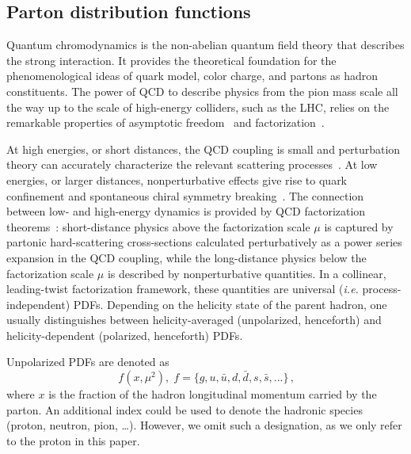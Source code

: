 \subsection{Parton distribution functions}
\label{Sec:IntroPDFs}

Quantum chromodynamics is the non-abelian quantum field 
theory that describes the strong interaction.
%
It provides the theoretical foundation for the phenomenological ideas of 
quark model, color charge, and partons as hadron constituents.
%
The power of QCD to describe physics from the pion mass scale all the way up 
to the scale of high-energy colliders, such as the LHC, relies on the 
remarkable properties of asymptotic freedom~\cite{Gross:1973ju,Gross:1973id,
Gross:1974cs,Politzer:1974fr} and 
factorization~\cite{Collins:1987pm,Collins:1989gx}.

At high energies, or short distances, the QCD coupling is small 
and perturbation theory can accurately characterize the relevant scattering 
processes~\cite{Campbell:2006wx}.
%
At low energies, or larger distances, nonperturbative effects give rise to 
quark confinement and spontaneous chiral symmetry breaking~\cite{Gasser:1983yg}.
%
The connection between low- and high-energy dynamics is provided by QCD 
factorization theorems~\cite{Collins:1987pm,Collins:1989gx}: 
short-distance physics above the factorization scale $\mu$ is captured by 
partonic hard-scattering cross-sections calculated perturbatively as a 
power series expansion in the QCD coupling, while the 
long-distance physics below the factorization scale $\mu$ is described by 
nonperturbative quantities.
%
In a collinear, leading-twist factorization framework, these quantities are
universal ({\it i.e.} process-independent) PDFs.
%
Depending on the helicity state of the parent hadron, one usually 
distinguishes between helicity-averaged (unpolarized, henceforth)
and helicity-dependent (polarized, henceforth) PDFs.

Unpolarized PDFs are denoted as 
\begin{equation}
f(x,\mu^2)\mbox{,} \ \ f=\{g,u,\bar{u},d,\bar{d},s,\bar{s},...\}
\,\mbox{,}
\label{eq:unpPDFs}
\end{equation}
where $x$ is the fraction
of the hadron longitudinal momentum carried by the parton.
%
An additional index could be used to denote the hadronic species (proton,
neutron, pion, \dots).
%
However, we omit such a designation, as we only refer to the proton
in this paper.

